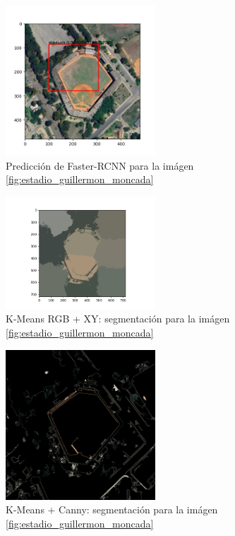 \documentclass[article]{llncs}
\begin{document}
\begin{figure}[h]
    \centering
    \includegraphics[width=0.5\textwidth]{Figure_1.png}
    \caption{Predicci\'on de Faster-RCNN para la im\'agen \ref{fig:estadio_guillermon_moncada}}
    \label{fig:SAM}
\end{figure}

\begin{figure}[h]
  \centering
  \includegraphics[width=0.5\textwidth]{Figure_2.png}
  \caption{K-Means RGB + XY: segmentación para la im\'agen \ref{fig:estadio_guillermon_moncada}}
  \label{fig:Figure_2}
\end{figure}

\begin{figure}[h]
  \centering
  \includegraphics[width=0.5\textwidth]{canny.png}
  \caption{K-Means + Canny: segmentación para la im\'agen \ref{fig:estadio_guillermon_moncada}}
  \label{fig:canny}
\end{figure}
\end{document}
